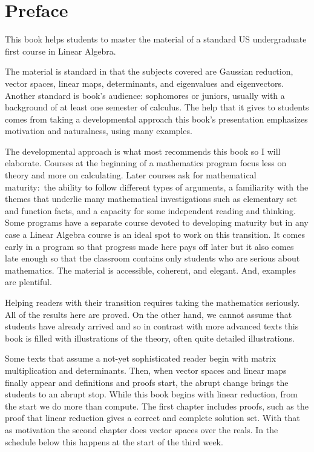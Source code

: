 {\setlength{\parskip}{.7ex}  %
\chapter*{Preface}
This book helps students to master the material of a standard 
US undergraduate first course in Linear Algebra.

The material is standard in that the subjects covered are
Gaussian reduction, 
vector spaces, linear maps,
determinants, and eigenvalues and eigenvectors.
Another standard is book's audience:
sophomores or juniors, usually with a background 
of at least one semester of calculus. 
The help that it gives to students comes from taking a developmental 
approach\Dash 
this book's presentation emphasizes motivation and naturalness, 
using many examples.

The developmental approach is what most recommends this book
so I will elaborate.
Courses at the beginning of a mathematics program
focus less on theory and more on calculating.
Later courses
ask for mathematical maturity:~the ability to follow different 
types of arguments, 
a familiarity with
the themes that underlie many mathematical investigations such as
elementary set and function facts,
and a capacity for some independent reading and thinking.
Some programs have a separate course devoted to developing maturity but
in any case a Linear Algebra course 
is an ideal spot to work on this transition.
It comes early in a program so that progress made here pays off later
but it also comes late enough so that the classroom contains only
students who are serious about mathematics.
The material is accessible, coherent, and elegant.
And, examples are plentiful.

Helping readers with their transition 
requires taking the mathematics seriously. 
All of the results here are proved.
On the other hand, we cannot
assume that students have already arrived
and so 
in contrast with more advanced texts 
this book is filled with illustrations of the theory,
often quite detailed illustrations.

Some texts that assume a not-yet sophisticated reader
begin with matrix multiplication and determinants.
Then, when 
vector spaces and linear maps finally appear
and definitions and proofs start, the abrupt change
brings the students to an abrupt stop.
While this book begins with
linear reduction, from the start
we do more than compute.
The first chapter
includes proofs, such as the proof that linear reduction gives a correct and
complete solution set.
With that as motivation
the second chapter does vector spaces over the reals.
In the schedule below this happens at the start of the third week.

}
